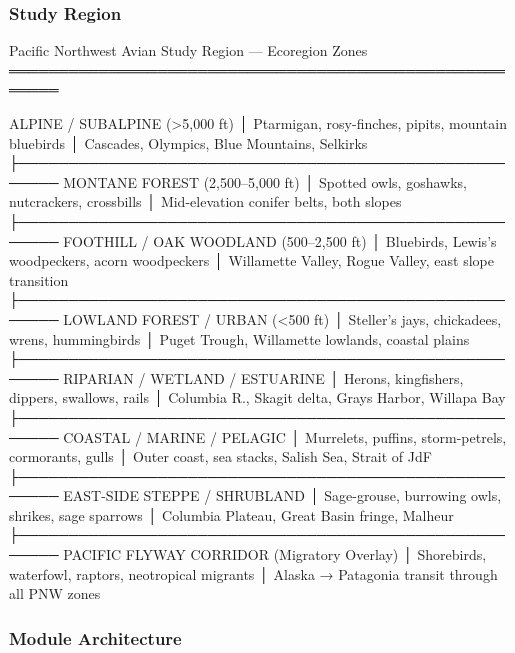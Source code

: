 \documentclass[11pt,letterpaper]{article}
\begin{document}
\subsubsection{Study Region}

\begin{asciibox}
Pacific Northwest Avian Study Region — Ecoregion Zones
═══════════════════════════════════════════════════════

ALPINE / SUBALPINE (>5,000 ft)
│ Ptarmigan, rosy-finches, pipits, mountain bluebirds
│ Cascades, Olympics, Blue Mountains, Selkirks
├──────────────────────────────────────────────────────
MONTANE FOREST (2,500–5,000 ft)
│ Spotted owls, goshawks, nutcrackers, crossbills
│ Mid-elevation conifer belts, both slopes
├──────────────────────────────────────────────────────
FOOTHILL / OAK WOODLAND (500–2,500 ft)
│ Bluebirds, Lewis's woodpeckers, acorn woodpeckers
│ Willamette Valley, Rogue Valley, east slope transition
├──────────────────────────────────────────────────────
LOWLAND FOREST / URBAN (<500 ft)
│ Steller's jays, chickadees, wrens, hummingbirds
│ Puget Trough, Willamette lowlands, coastal plains
├──────────────────────────────────────────────────────
RIPARIAN / WETLAND / ESTUARINE
│ Herons, kingfishers, dippers, swallows, rails
│ Columbia R., Skagit delta, Grays Harbor, Willapa Bay
├──────────────────────────────────────────────────────
COASTAL / MARINE / PELAGIC
│ Murrelets, puffins, storm-petrels, cormorants, gulls
│ Outer coast, sea stacks, Salish Sea, Strait of JdF
├──────────────────────────────────────────────────────
EAST-SIDE STEPPE / SHRUBLAND
│ Sage-grouse, burrowing owls, shrikes, sage sparrows
│ Columbia Plateau, Great Basin fringe, Malheur
├──────────────────────────────────────────────────────
PACIFIC FLYWAY CORRIDOR (Migratory Overlay)
│ Shorebirds, waterfowl, raptors, neotropical migrants
│ Alaska → Patagonia transit through all PNW zones
\end{asciibox}

\subsubsection{Module Architecture}
\end{document}
